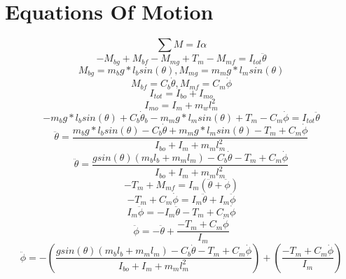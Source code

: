 \documentclass[12pt]{article}
\begin{document}
	\section{Equations Of Motion}
		\begin{equation}
			\sum M = I\alpha
		\end{equation}
		\begin{equation}
			-M_{bg}+M_{bf}-M_{mg}+T_m-M_{mf} = I_{tot}\ddot\theta
		\end{equation}
		\begin{equation}
			M_{bg} = m_b g*l_b sin(\theta), M_{mg} = m_m g*l_msin(\theta)
		\end{equation}
		\begin{equation}
			M_{bf} = C_b \dot\theta, M_{mf} = C_m \dot\phi
		\end{equation}
		\begin{equation}
			I_{tot} = I_{bo} + I_{mo}
		\end{equation}
		\begin{equation}
			I_{mo} = I_m+m_wl_m^2
		\end{equation}
		\begin{equation}
			-m_b g*l_b sin(\theta) + C_b \dot{\theta}_b - m_m g*l_msin(\theta) + T_m - C_m \dot\phi = I_{tot}\ddot\theta
		\end{equation}
		\begin{equation}
			\ddot\theta = \frac{m_b g*l_b sin(\theta) - C_b \dot\theta + m_m g*l_msin(\theta) - T_m + C_m \dot\phi}{I_{bo}+I_m+m_ml_m^2}
		\end{equation}
		\begin{equation}
			\ddot\theta = \frac{gsin(\theta)(m_bl_b + m_ml_m) - C_b \dot\theta - T_m + C_m \dot\phi}{I_{bo}+I_m+m_ml_m^2}
		\end{equation}
		\begin{equation}
			-T_m+M_{mf} = I_m(\ddot\theta + \ddot\phi)
		\end{equation}
		\begin{equation}
			-T_m + C_m\dot\phi = I_m\ddot\theta + I_m\ddot\phi
		\end{equation}
		\begin{equation}
			I_m\ddot\phi = -I_m\ddot\theta-T_m+C_m\dot\phi
		\end{equation}
		\begin{equation}
			\ddot\phi = - \ddot\theta + \frac{-T_m+C_m\dot\phi}{I_m}
		\end{equation}
		\begin{equation}
			\ddot\phi = -\left(\frac{gsin(\theta)(m_bl_b + m_ml_m) - C_b \dot\theta - T_m + C_m \dot\phi}{I_{bo}+I_m+m_ml_m^2}\right) + \left(\frac{-T_m+C_m\dot\phi}{I_m}\right)
		\end{equation}
\end{document}
